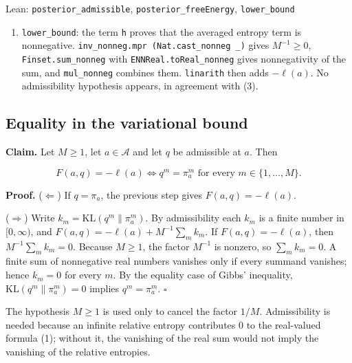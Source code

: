 \documentclass[11pt,a4paper]{report}
\begin{document}
\begin{leanbox}{Lean: \texttt{posterior\_\allowbreak{}admissible}, \texttt{posterior\_\allowbreak{}freeEnergy}, \texttt{lower\_\allowbreak{}bound}}
\begin{enumerate}
\item \texttt{lower\_\allowbreak{}bound}: the term \texttt{h} proves that the averaged entropy term is nonnegative. \texttt{inv\_\allowbreak{}nonneg.\allowbreak{}mpr (Nat.\allowbreak{}cast\_\allowbreak{}nonneg \_\allowbreak{})} gives \(M^{-1}\ge0\), \texttt{Finset.\allowbreak{}sum\_\allowbreak{}nonneg} with \texttt{ENNReal.\allowbreak{}to\allowbreak{}Real\_\allowbreak{}nonneg} gives nonnegativity of the sum, and \texttt{mul\_\allowbreak{}nonneg} combines them. \texttt{linarith} then adds \(-\ell(a)\). No admissibility hypothesis appears, in agreement with (3).

\end{enumerate}
\end{leanbox}
\subsection{\texorpdfstring{Equality in the variational bound}{Equality in the variational bound}}


\textbf{Claim.} Let \(M\ge1\), let \(a\in\mathcal A\) and let \(q\) be admissible at \(a\). Then


\[F(a,q)=-\ell(a)\iff q^m=\pi_a^m\text{ for every }m\in\{1,\dots,M\}.\]


\textbf{Proof.} (\(\Leftarrow\)) If \(q=\pi_a\), the previous step gives \(F(a,q)=-\ell(a)\).




(\(\Rightarrow\)) Write \(k_m=\mathrm{KL}(q^m\|\pi_a^m)\). By admissibility each \(k_m\) is a finite number in \([0,\infty)\), and \(F(a,q)=-\ell(a)+M^{-1}\sum_mk_m\). If \(F(a,q)=-\ell(a)\), then \(M^{-1}\sum_mk_m=0\). Because \(M\ge1\), the factor \(M^{-1}\) is nonzero, so \(\sum_mk_m=0\). A finite sum of nonnegative real numbers vanishes only if every summand vanishes; hence \(k_m=0\) for every \(m\). By the equality case of Gibbs' inequality, \(\mathrm{KL}(q^m\|\pi_a^m)=0\) implies \(q^m=\pi_a^m\). \(\square\)




The hypothesis \(M\ge1\) is used only to cancel the factor \(1/M\). Admissibility is needed because an infinite relative entropy contributes \(0\) to the real-valued formula (1); without it, the vanishing of the real sum would not imply the vanishing of the relative entropies.
\end{document}

